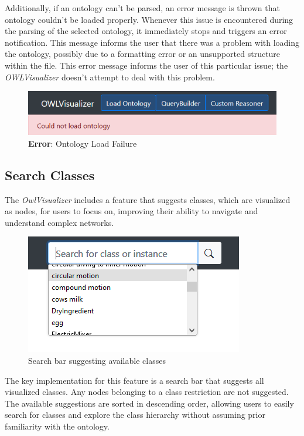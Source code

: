Additionally, if an ontology can't be parsed, an error message is thrown that ontology couldn't be
loaded properly. Whenever this issue is encountered during the parsing of the selected ontology, it immediately stops and triggers an error notification. 
This message informs the user that there was a problem with loading the ontology, possibly due to a formatting error or an unsupported structure within the file. 
This error message informs the user of this particular issue; the \textit{OWLVisualizer} doesn't attempt to deal with this problem.

\begin{figure}[H]
    \includegraphics[scale=0.5]{Graphics/OwlVisualizer/loadOntology3.png}
    \centering
    \caption{\textbf{Error}: Ontology Load Failure}
    \label{fig:loadOntology3}
\end{figure}

\subsection{Search Classes}
The \textit{OwlVisualizer} includes a feature that suggests classes, which are visualized as nodes, 
for users to focus on, improving their ability to navigate and understand complex networks.

\begin{figure}[H]
    \includegraphics[scale=0.6]{Graphics/OwlVisualizer/searchClass1.png}
    \centering
    \caption{Search bar suggesting available classes}
\end{figure}

The key implementation for this feature is a search bar that suggests all visualized classes. 
Any nodes belonging to a class restriction are not suggested. 
The available suggestions are sorted in descending order, allowing users to easily search
for classes and explore the class hierarchy without assuming prior familiarity with the ontology.

